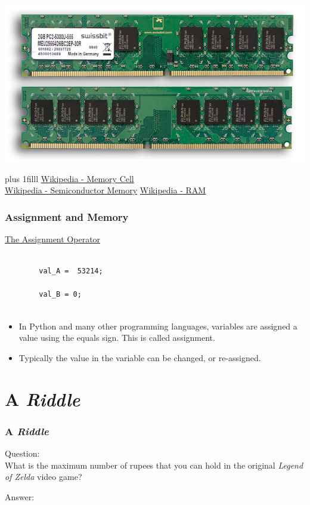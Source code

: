 \documentclass[fleqn]{beamer} %
\newcommand{\sectiontitleIII}{Assignment and Memory}
\newcommand{\sectiontitleIV}{A {\it Riddle} }
\newcommand{\btVFill}{\vskip0pt plus 1filll}
\begin{document}
\begin{frame}
		\includegraphics[scale=.50]{ramstick.jpg}
		
		\btVFill
		\href{https://en.wikipedia.org/wiki/Memory_cell_(computing)}{Wikipedia - Memory Cell} \\
		\href{https://en.wikipedia.org/wiki/Semiconductor_memory}{Wikipedia - Semiconductor Memory}
		\href{https://en.wikipedia.org/wiki/Random-access_memory}{Wikipedia - RAM}

	\end{frame}

	\begin{frame}[containsverbatim] \small
	\frametitle{\sectiontitleIII}

	\underline{The Assignment Operator} \vspace{5mm} \\

	\begin{lstlisting}
	
		val_A =  53214;
	
		val_B = 0;
	
	\end{lstlisting}
	
	\begin{itemize}
		\item In Python and many other programming languages, variables are assigned a value using the equals sign. This is called {\BL assignment}.
		\item Typically the value in the variable can be changed, or re-assigned. 
		
	\end{itemize}
	
	
	\end{frame}


\section{\sectiontitleIV}	
	\begin{frame}[label=sectionIV] \small
		\frametitle{\sectiontitleIV}    
		
		Question: \vspace{5mm}\\ What is the maximum number of rupees that you can hold in the original {\it Legend of Zelda} video game? 
		\vspace{25mm}
		
		Answer:

	\end{frame}
\end{document}
